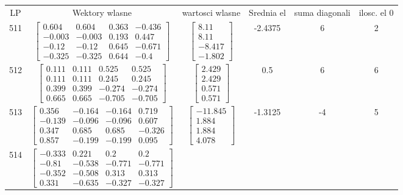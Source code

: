 \documentclass[a4paper,12pt]{article}
\begin{document}
\bgroup {} \vspace{0.2in} \begin{tabular}{c c c c c c}
LP &Wektory wlasne & wartosci wlasne & Srednia el & suma diagonali & ilosc. el 0\\
511
&
$\begin{bmatrix} 0.604 & 0.604 & 0.363 & -0.436 \\ -0.003 & -0.003 & 0.193 & 0.447 \\ -0.12 & -0.12 & 0.645 & -0.671 \\ -0.325 & -0.325 & 0.644 & -0.4 \end{bmatrix}$
&
$\begin{bmatrix} 8.11 \\ 8.11 \\ -8.417 \\ -1.802 \end{bmatrix}$
&
-2.4375
&
6
&
2
\\
512
&
$\begin{bmatrix} 0.111 & 0.111 & 0.525 & 0.525 \\ 0.111 & 0.111 & 0.245 & 0.245 \\ 0.399 & 0.399 & -0.274 & -0.274 \\ 0.665 & 0.665 & -0.705 & -0.705 \end{bmatrix}$
&
$\begin{bmatrix} 2.429 \\ 2.429 \\ 0.571 \\ 0.571 \end{bmatrix}$
&
0.5
&
6
&
6
\\
513
&
$\begin{bmatrix} 0.356 & -0.164 & -0.164 & 0.719 \\ -0.139 & -0.096 & -0.096 & 0.607 \\ 0.347 & 0.685 & 0.685 & -0.326 \\ 0.857 & -0.199 & -0.199 & 0.095 \end{bmatrix}$
&
$\begin{bmatrix} -11.845 \\ 1.884 \\ 1.884 \\ 4.078 \end{bmatrix}$
&
-1.3125
&
-4
&
5
\\
514
&
$\begin{bmatrix} -0.333 & 0.221 & 0.2 & 0.2 \\ -0.81 & -0.538 & -0.771 & -0.771 \\ -0.352 & -0.508 & 0.313 & 0.313 \\ 0.331 & -0.635 & -0.327 & -0.327 \end{bmatrix}$

\end{tabular}
\end{document}
